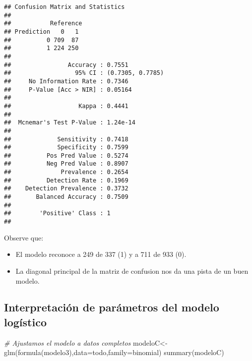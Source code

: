 \documentclass[
]{article}
\newenvironment{Shaded}{\begin{snugshade}}{\end{snugshade}}
\newcommand{\AttributeTok}[1]{\textcolor[rgb]{0.77,0.63,0.00}{#1}}
\newcommand{\CommentTok}[1]{\textcolor[rgb]{0.56,0.35,0.01}{\textit{#1}}}
\newcommand{\FunctionTok}[1]{\textcolor[rgb]{0.00,0.00,0.00}{#1}}
\newcommand{\NormalTok}[1]{#1}
\newcommand{\OtherTok}[1]{\textcolor[rgb]{0.56,0.35,0.01}{#1}}
\providecommand{\tightlist}{%
  \setlength{\itemsep}{0pt}\setlength{\parskip}{0pt}}
\begin{document}
\begin{verbatim}
## Confusion Matrix and Statistics
## 
##           Reference
## Prediction   0   1
##          0 709  87
##          1 224 250
##                                           
##                Accuracy : 0.7551          
##                  95% CI : (0.7305, 0.7785)
##     No Information Rate : 0.7346          
##     P-Value [Acc > NIR] : 0.05164         
##                                           
##                   Kappa : 0.4441          
##                                           
##  Mcnemar's Test P-Value : 1.24e-14        
##                                           
##             Sensitivity : 0.7418          
##             Specificity : 0.7599          
##          Pos Pred Value : 0.5274          
##          Neg Pred Value : 0.8907          
##              Prevalence : 0.2654          
##          Detection Rate : 0.1969          
##    Detection Prevalence : 0.3732          
##       Balanced Accuracy : 0.7509          
##                                           
##        'Positive' Class : 1               
## 
\end{verbatim}

Observe que:

\begin{itemize}
\tightlist
\item
  El modelo reconoce a 249 de 337 (1) y a 711 de 933 (0).
\item
  La diagonal principal de la matriz de confusion nos da una pista de un
  buen modelo.
\end{itemize}

\hypertarget{interpretaciuxf3n-de-paruxe1metros-del-modelo-loguxedstico}{%
\subsection{Interpretación de parámetros del modelo
logístico}\label{interpretaciuxf3n-de-paruxe1metros-del-modelo-loguxedstico}}

\begin{Shaded}
\begin{Highlighting}[]
\CommentTok{\# Ajustamos el modelo a datos completos }
\NormalTok{modeloC}\OtherTok{\textless{}{-}}\FunctionTok{glm}\NormalTok{(}\FunctionTok{formula}\NormalTok{(modelo3),}\AttributeTok{data=}\NormalTok{todo,}\AttributeTok{family=}\NormalTok{binomial)}
\FunctionTok{summary}\NormalTok{(modeloC)}
\end{Highlighting}
\end{Shaded}
\end{document}
